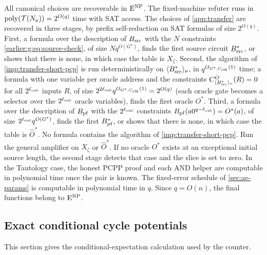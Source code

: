 All canonical choices are recoverable in $\mathrm{E}^{\mathrm{NP}}$.
The fixed-machine refuter runs in $\operatorname{poly}(\mathcal T(N_\nu))
=2^{O(q)}$ time with SAT access. The choices of
\cref{app:transfer} are recovered in three stages, by prefix
self-reduction on SAT formulas of size $2^{O(q)}$. First, a formula over
the description of $B_{\rm src}$ with the $N$ constraints
\eqref{earlier:g:eq:source-check}, of size $Nq^{O({G^\star})}$, finds the first source
circuit $B^*_{\rm src}$, or shows that there is none, in which case the
table is $X_\zeta$. Second, the algorithm of \cref{imp:transfer-short-pcp} is run
deterministically on $\langle B^*_{\rm src}\rangle_\nu$, in
$q^{O_{{G^\star},C_{\rm clk}}(1)}$ time; a formula with one variable per oracle address and the
constraints $C^O_{\langle B^*_{\rm src}\rangle_\nu}(R)=0$ for all
$2^{\ell_{\rm out}}$ inputs $R$, of size
$2^{2\ell_{\rm out}}q^{O_{{G^\star},C_{\rm clk}}(1)}=2^{O(q)}$ (each oracle gate
becomes a selector over the $2^{\ell_{\rm out}}$ oracle variables),
finds the first oracle $O^*$. Third, a formula over the description of
$B_{\rm pf}$ with the $2^{\ell_{\rm out}}$ constraints
$B_{\rm pf}(a0^{q-\ell_{\rm out}})=O^*(a)$, of size
$2^{\ell_{\rm out}}q^{O({G^\star})}$, finds the first $B^*_{\rm pf}$, or shows
that there is none, in which case the table is $\widehat O^*$. No formula
contains the algorithm of \cref{imp:transfer-short-pcp}. Run the general amplifier
on $X_\zeta$ or $\widehat O^*$. If no oracle $O^*$ exists at an exceptional
initial source length, the second stage detects that case and the slice
is set to zero. In the Tautology case, the honest PCPP proof and each AND helper are
computable in polynomial time once the pair is known. The fixed-error schedule of \cref{sec:ae-params} is computable in polynomial time in $q$. Since $q=O(n)$,
the final functions belong to $\mathrm{E}^{\mathrm{NP}}$.


\subsection{Exact conditional cycle potentials}\label{earlier:conditional-potentials}
This section gives the conditional-expectation calculation used by the counter.

